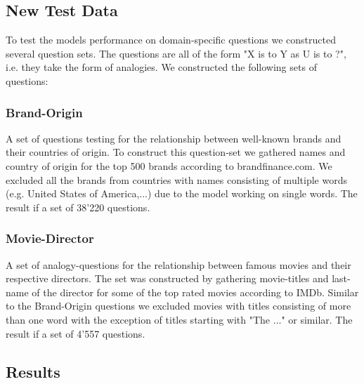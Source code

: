 \documentclass[conference]{IEEEtran}
\begin{document}
\subsection{New Test Data}
To test the models performance on domain-specific questions we constructed several 
question sets. The questions are all of the form "X is to Y as U is to ?", i.e. they take the 
form of analogies. We constructed the following sets of questions:

\subsubsection{Brand-Origin}
A set of questions testing for the relationship between well-known brands and their countries
of origin. To construct this question-set we gathered names and country of origin for 
the top 500 brands according to brandfinance.com. We excluded all the brands from countries
with names consisting of multiple words (e.g. United States of America,...) due to the model 
working on single words. The result if a set of 38'220 questions.

\subsubsection{Movie-Director}
A set of analogy-questions for the relationship between famous movies and their respective 
directors. The set was constructed by gathering movie-titles and last-name of the director for 
some of the top rated movies according to IMDb. Similar to the Brand-Origin questions we 
excluded movies with titles consisting of more than one word with the exception of titles 
starting with "The ..." or similar.  The result if a set of 4'557 questions. 


\subsection{Results}
\label{sec:res}




%
%
\end{document}
